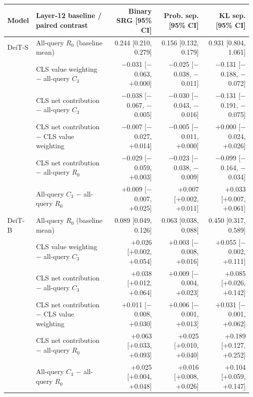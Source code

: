\begin{tabular}{@{}llrrr@{}}
\toprule
Model & Layer-12 baseline / paired contrast & Binary SRG [95\% CI] & Prob. sep. [95\% CI] & KL sep. [95\% CI] \\
\midrule
DeiT-S & All-query $R_0$ (baseline mean) & 0.244 [0.210, 0.279] & 0.156 [0.132, 0.179] & 0.931 [0.804, 1.061] \\
 & CLS value weighting $-$ all-query $C_3$ & $-$0.031 [$-$0.063, +0.000] & $-$0.025 [$-$0.038, $-$0.011] & $-$0.131 [$-$0.188, $-$0.072] \\
 & CLS net contribution $-$ all-query $C_3$ & $-$0.038 [$-$0.067, $-$0.005] & $-$0.030 [$-$0.043, $-$0.016] & $-$0.131 [$-$0.191, $-$0.075] \\
 & CLS net contribution $-$ CLS value weighting & $-$0.007 [$-$0.027, +0.014] & $-$0.005 [$-$0.011, +0.000] & +0.000 [$-$0.024, +0.026] \\
 & CLS net contribution $-$ all-query $R_0$ & $-$0.029 [$-$0.059, +0.003] & $-$0.023 [$-$0.038, $-$0.009] & $-$0.099 [$-$0.164, $-$0.034] \\
 & All-query $C_3$ $-$ all-query $R_0$ & +0.009 [$-$0.007, +0.025] & +0.007 [+0.002, +0.011] & +0.033 [+0.007, +0.061] \\
\midrule
DeiT-B & All-query $R_0$ (baseline mean) & 0.089 [0.049, 0.126] & 0.063 [0.038, 0.088] & 0.450 [0.317, 0.589] \\
 & CLS value weighting $-$ all-query $C_3$ & +0.026 [+0.002, +0.054] & +0.003 [$-$0.008, +0.016] & +0.055 [$-$0.002, +0.111] \\
 & CLS net contribution $-$ all-query $C_3$ & +0.038 [+0.012, +0.064] & +0.009 [$-$0.004, +0.023] & +0.085 [+0.026, +0.142] \\
 & CLS net contribution $-$ CLS value weighting & +0.011 [$-$0.008, +0.030] & +0.006 [$-$0.001, +0.013] & +0.031 [$-$0.001, +0.062] \\
 & CLS net contribution $-$ all-query $R_0$ & +0.063 [+0.033, +0.093] & +0.025 [+0.010, +0.040] & +0.189 [+0.127, +0.252] \\
 & All-query $C_3$ $-$ all-query $R_0$ & +0.025 [+0.004, +0.048] & +0.016 [+0.008, +0.026] & +0.104 [+0.059, +0.147] \\
\bottomrule
\end{tabular}
